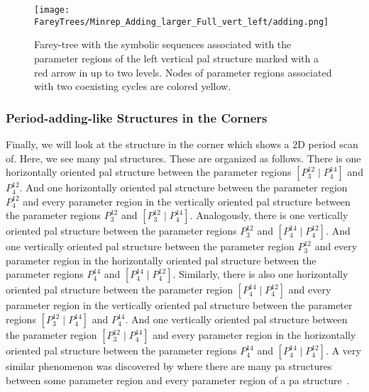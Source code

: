 \begin{figure}
	\centering
	\texttt{[image: FareyTrees/Minrep\_Adding\_larger\_Full\_vert\_left/adding.png]}
	\caption[Farey-tree with the symbolic sequences of a horizontal  structure]{
		Farey-tree with the symbolic sequences associated with the parameter regions of the left vertical \gls{pal} structure marked with a red arrow in  up to two levels.
		Nodes of parameter regions associated with two coexisting cycles are colored yellow.
	}
	\label{fig:add.add.like.vert.tree}
\end{figure}

\subsubsection{Period-adding-like Structures in the Corners}

Finally, we will look at the structure in the corner which  shows a 2D period scan of.
Here, we see many \gls{pal} structures.
These are organized as follows.
There is one horizontally oriented \gls{pal} structure between the parameter regions $\left[P^{12}_3 \mid P^{14}_4\right]$ and $P^{12}_4$.
And one horizontally oriented \gls{pal} structure between the parameter region $P^{12}_4$ and every parameter region in the vertically oriented \gls{pal} structure between the parameter regions $P^{12}_3$ and $\left[P^{12}_3 \mid P^{14}_4\right]$.
Analogously, there is one vertically oriented \gls{pal} structure between the parameter regions $P^{12}_3$ and $\left[P^{14}_4 \mid P^{12}_4\right]$.
And one vertically oriented \gls{pal} structure between the parameter region $P^{12}_3$ and every parameter region in the horizontally oriented \gls{pal} structure between the parameter regions $P^{14}_4$ and $\left[P^{14}_4 \mid P^{12}_4\right]$.
Similarly, there is also one horizontally oriented \gls{pal} structure between the parameter region $\left[P^{14}_4 \mid P^{12}_4\right]$ and every parameter region in the vertically oriented \gls{pal} structure between the parameter regions $\left[P^{12}_3 \mid P^{14}_4\right]$ and $P^{14}_4$.
And one vertically oriented \gls{pal} structure between the parameter region $\left[P^{12}_3 \mid P^{14}_4\right]$ and every parameter region in the horizontally oriented \gls{pal} structure between the parameter regions $P^{14}_4$ and $\left[P^{14}_4 \mid P^{12}_4\right]$.
A very similar phenomenon was discovered by  where there are many \gls{pa} structures between some parameter region and every parameter region of a \gls{pa} structure~\cite{tramontana2012period}.

